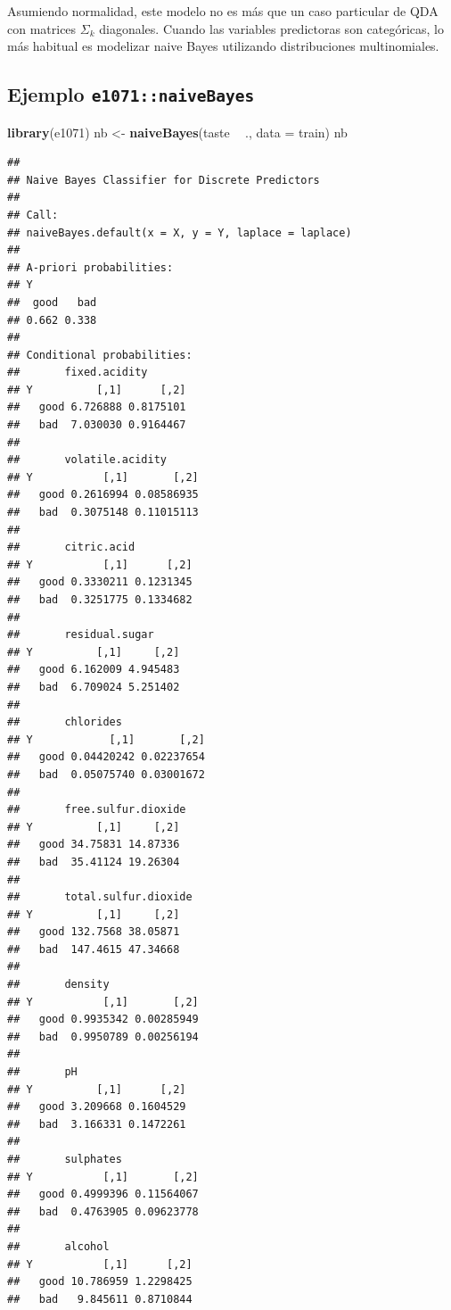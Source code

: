 \documentclass[
]{book}
\newenvironment{Shaded}{\begin{snugshade}}{\end{snugshade}}
\newcommand{\DataTypeTok}[1]{\textcolor[rgb]{0.13,0.29,0.53}{#1}}
\newcommand{\KeywordTok}[1]{\textcolor[rgb]{0.13,0.29,0.53}{\textbf{#1}}}
\newcommand{\NormalTok}[1]{#1}
\newcommand{\OperatorTok}[1]{\textcolor[rgb]{0.81,0.36,0.00}{\textbf{#1}}}
\newcommand{\StringTok}[1]{\textcolor[rgb]{0.31,0.60,0.02}{#1}}
\theoremstyle{break}
\theoremstyle{definition}
\theoremstyle{definition}
\theoremstyle{definition}
\theoremstyle{remark}
\begin{document}
Asumiendo normalidad, este modelo no es más que un caso particular de QDA con matrices \(\Sigma_k\) diagonales. Cuando las variables predictoras son categóricas, lo más habitual es modelizar naive Bayes utilizando distribuciones multinomiales.

\hypertarget{ejemplo-e1071naivebayes}{%
\subsection{\texorpdfstring{Ejemplo \texttt{e1071::naiveBayes}}{Ejemplo e1071::naiveBayes}}\label{ejemplo-e1071naivebayes}}

\begin{Shaded}
\begin{Highlighting}[]
\KeywordTok{library}\NormalTok{(e1071)}
\NormalTok{nb <-}\StringTok{ }\KeywordTok{naiveBayes}\NormalTok{(taste }\OperatorTok{~}\StringTok{ }\NormalTok{., }\DataTypeTok{data =}\NormalTok{ train)}
\NormalTok{nb}
\end{Highlighting}
\end{Shaded}

\begin{verbatim}
## 
## Naive Bayes Classifier for Discrete Predictors
## 
## Call:
## naiveBayes.default(x = X, y = Y, laplace = laplace)
## 
## A-priori probabilities:
## Y
##  good   bad 
## 0.662 0.338 
## 
## Conditional probabilities:
##       fixed.acidity
## Y          [,1]      [,2]
##   good 6.726888 0.8175101
##   bad  7.030030 0.9164467
## 
##       volatile.acidity
## Y           [,1]       [,2]
##   good 0.2616994 0.08586935
##   bad  0.3075148 0.11015113
## 
##       citric.acid
## Y           [,1]      [,2]
##   good 0.3330211 0.1231345
##   bad  0.3251775 0.1334682
## 
##       residual.sugar
## Y          [,1]     [,2]
##   good 6.162009 4.945483
##   bad  6.709024 5.251402
## 
##       chlorides
## Y            [,1]       [,2]
##   good 0.04420242 0.02237654
##   bad  0.05075740 0.03001672
## 
##       free.sulfur.dioxide
## Y          [,1]     [,2]
##   good 34.75831 14.87336
##   bad  35.41124 19.26304
## 
##       total.sulfur.dioxide
## Y          [,1]     [,2]
##   good 132.7568 38.05871
##   bad  147.4615 47.34668
## 
##       density
## Y           [,1]       [,2]
##   good 0.9935342 0.00285949
##   bad  0.9950789 0.00256194
## 
##       pH
## Y          [,1]      [,2]
##   good 3.209668 0.1604529
##   bad  3.166331 0.1472261
## 
##       sulphates
## Y           [,1]       [,2]
##   good 0.4999396 0.11564067
##   bad  0.4763905 0.09623778
## 
##       alcohol
## Y           [,1]      [,2]
##   good 10.786959 1.2298425
##   bad   9.845611 0.8710844
\end{verbatim}
\end{document}
